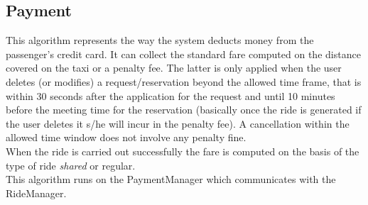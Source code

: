 \documentclass[a4paper,11pt]{report} %
\begin{document}
	\subsection{Payment}
	This algorithm represents the way the system deducts money from the passenger's credit card. It can collect the standard fare computed on the distance covered on the taxi or a penalty fee. The latter is only applied when the user deletes (or modifies) a request/reservation beyond the allowed time frame, that is within 30 seconds after the application for the request and until 10 minutes before the meeting time for the reservation (basically once the ride is generated if the user deletes it s/he will incur in the penalty fee). A cancellation within the allowed time window does not involve any penalty fine.\\
	When the ride is carried out successfully the fare is computed on the basis of the type of ride \textit{shared} or regular.\\
	This algorithm runs on the PaymentManager which communicates with the RideManager.\\
	
\end{document}
